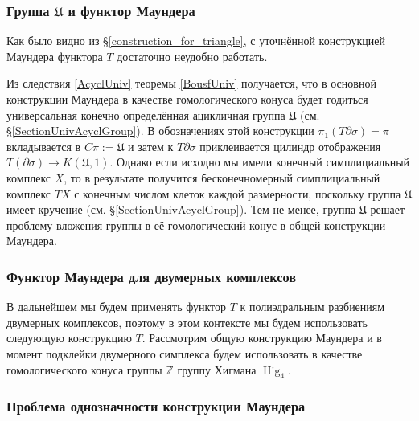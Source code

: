 \documentclass[14pt, dvipsnames, twoside]{extarticle}
\theoremstyle{definition}
\theoremstyle{remark}
\DeclareMathOperator{\Hig}{\mathrm{Hig}}
\begin{document}
\subsubsection{Группа $\mathfrak{U}$ и функтор Маундера}\label{modification}

Как было видно из \S\ref{construction_for_triangle}, с уточнённой конструкцией Маундера функтора $T$ достаточно неудобно работать.

Из следствия \ref{AcyclUniv} теоремы \ref{BousfUniv} получается, что в основной конструкции Маундера в качестве гомологического конуса будет годиться универсальная конечно определённая ацикличная группа $\mathfrak{U}$ (см. \S\ref{SectionUnivAcyclGroup}). В обозначениях этой конструкции $\pi_1(T\partial\sigma) = \pi$ вкладывается в $C\pi := \mathfrak{U}$ и затем к $T\partial\sigma$ приклеивается цилиндр отображения $T(\partial\sigma)\to K(\mathfrak{U}, 1)$. Однако если исходно мы имели конечный симплициальный комплекс $X$, то в результате получится бесконечномерный симплициальный комплекс $TX$ с конечным числом клеток каждой размерности, поскольку группа $\mathfrak{U}$ имеет кручение (см. \S\ref{SectionUnivAcyclGroup}). Тем не менее, группа $\mathfrak{U}$ решает проблему вложения группы в её гомологический конус в общей конструкции Маундера.





\subsubsection{Функтор Маундера для двумерных комплексов}\label{two_complex}

В дальнейшем мы будем применять функтор $T$ к полиэдральным разбиениям двумерных комплексов, поэтому в этом контексте мы будем использовать следующую конструкцию $T$. Рассмотрим общую конструкцию Маундера и в момент подклейки двумерного симплекса будем использовать в качестве гомологического конуса группы $\mathbb{Z}$ группу Хигмана $\Hig_4$.













\subsubsection{Проблема однозначности конструкции Маундера}
\end{document}
